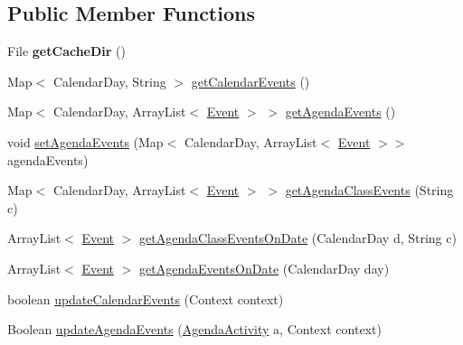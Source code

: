 \subsection*{Public Member Functions}
\begin{DoxyCompactItemize}
\item 
\mbox{\label{classit_1_1diegocastagna_1_1ifermi_1_1models_1_1_model_ac8f725e58d2c4ea90bc1d3cbdd78e616}} 
File {\bfseries get\+Cache\+Dir} ()
\item 
Map$<$ Calendar\+Day, String $>$ \mbox{\hyperlink{classit_1_1diegocastagna_1_1ifermi_1_1models_1_1_model_adff72f3afe2018d7814b2227083b93ad}{get\+Calendar\+Events}} ()
\item 
Map$<$ Calendar\+Day, Array\+List$<$ \mbox{\hyperlink{classit_1_1diegocastagna_1_1ifermi_1_1utils_1_1_event}{Event}} $>$ $>$ \mbox{\hyperlink{classit_1_1diegocastagna_1_1ifermi_1_1models_1_1_model_afe878be51289990d656e7c12fd07962c}{get\+Agenda\+Events}} ()
\item 
void \mbox{\hyperlink{classit_1_1diegocastagna_1_1ifermi_1_1models_1_1_model_a6ecb34cb157160253a952c0b2a24811a}{set\+Agenda\+Events}} (Map$<$ Calendar\+Day, Array\+List$<$ \mbox{\hyperlink{classit_1_1diegocastagna_1_1ifermi_1_1utils_1_1_event}{Event}} $>$$>$ agenda\+Events)
\item 
Map$<$ Calendar\+Day, Array\+List$<$ \mbox{\hyperlink{classit_1_1diegocastagna_1_1ifermi_1_1utils_1_1_event}{Event}} $>$ $>$ \mbox{\hyperlink{classit_1_1diegocastagna_1_1ifermi_1_1models_1_1_model_a5abb79b8ecbe8030caf5d08ced00c330}{get\+Agenda\+Class\+Events}} (String c)
\item 
Array\+List$<$ \mbox{\hyperlink{classit_1_1diegocastagna_1_1ifermi_1_1utils_1_1_event}{Event}} $>$ \mbox{\hyperlink{classit_1_1diegocastagna_1_1ifermi_1_1models_1_1_model_ac1febcd79ed68035cea3411b15c9872c}{get\+Agenda\+Class\+Events\+On\+Date}} (Calendar\+Day d, String c)
\item 
Array\+List$<$ \mbox{\hyperlink{classit_1_1diegocastagna_1_1ifermi_1_1utils_1_1_event}{Event}} $>$ \mbox{\hyperlink{classit_1_1diegocastagna_1_1ifermi_1_1models_1_1_model_a70601163ab1b677f034aae7e608a9679}{get\+Agenda\+Events\+On\+Date}} (Calendar\+Day day)
\item 
boolean \mbox{\hyperlink{classit_1_1diegocastagna_1_1ifermi_1_1models_1_1_model_a4319427f5c24de469a4a420f1577fa07}{update\+Calendar\+Events}} (Context context)
\item 
Boolean \mbox{\hyperlink{classit_1_1diegocastagna_1_1ifermi_1_1models_1_1_model_a30cac7871b09f12804d672e4a003c05c}{update\+Agenda\+Events}} (\mbox{\hyperlink{classit_1_1diegocastagna_1_1ifermi_1_1activity_1_1_agenda_activity}{Agenda\+Activity}} a, Context context)
$$
\end{DoxyCompactItemize}
